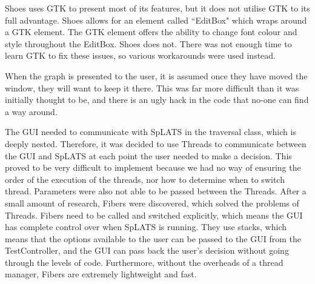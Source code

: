     Shoes uses GTK to present most of its features, but it does not utilise GTK to its full advantage. Shoes allows for an element called ``EditBox" which wraps around a GTK element. The GTK element offers the ability to change font colour and style throughout the EditBox. Shoes does not. There was not enough time to learn GTK to fix these issues, so various workarounds were used instead.
    
    When the graph is presented to the user, it is assumed once they have moved the window, they will want to keep it there. This was far more difficult than it was initially thought to be, and there is an ugly hack in the code that no-one can find a way around.
    
    The GUI needed to communicate with SpLATS in the traversal class, which is deeply nested. Therefore, it was decided to use Threads to communicate between the GUI and SpLATS at each point the user needed to make a decision. This proved to be very difficult to implement because we had no way of ensuring the order of the execution of the threads, nor how to determine when to switch thread. Parameters were also not able to be passed between the Threads. After a small amount of research, Fibers were discovered, which solved the problems of Threads. Fibers need to be called and switched explicitly, which means the GUI has complete control over when SpLATS is running. They use stacks, which means that the options available to the user can be passed to the GUI from the TestController, and the GUI can pass back the user's decision without going through the levels of code. Furthermore, without the overheads of a thread manager, Fibers are extremely lightweight and fast.
